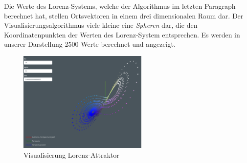 Die Werte des Lorenz-Systems, welche der Algorithmus im letzten Paragraph berechnet hat, stellen Ortsvektoren in einem drei dimensionalen Raum dar. Der Visualisierungsalgorithmus viele kleine eine \textit{Spheren} dar, die den Koordinatenpunkten der Werten des Lorenz-System entsprechen. Es werden in unserer Darstellung 2500 Werte berechnet und angezeigt.

\begin{figure}
	\centering	\includegraphics[height=5cm]{lorenz/assets/implementation/Visualisierung}
	\caption{Visualisierung Lorenz-Attraktor}
	\label{fig:visualisierung}
\end{figure}
